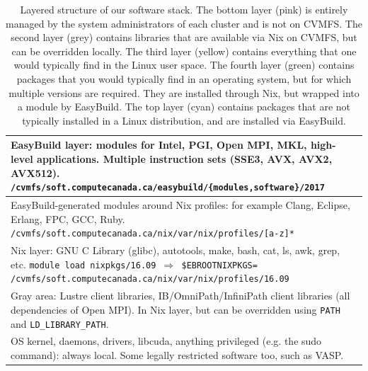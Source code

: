 \documentclass[sigconf]{acmart}
\begin{document}
\begin{table}
  \begin{center}
  {\Large
  \begin{tabular}{|p{}|}
  \hline \cellcolor{cyan}
  EasyBuild layer: modules for Intel, PGI, Open MPI, MKL, high-level applications.
  Multiple instruction sets (SSE3, AVX, AVX2, AVX512).\newline
  \texttt{/cvmfs/soft.computecanada.ca/easybuild/\{modules,software\}/2017}\\
  \hline \cellcolor{green}
  EasyBuild-generated modules around Nix profiles: for example Clang, Eclipse,
  Erlang, FPC, GCC, Ruby.\newline
  \texttt{/cvmfs/soft.computecanada.ca/nix/var/nix/profiles/[a-z]\**}\\
  \hline \cellcolor{yellow}
  Nix layer: GNU C Library (glibc), autotools, make, bash, cat, ls, awk, grep, etc. \newline
  \texttt{module load nixpkgs/16.09 $\Rightarrow$ \$EBROOTNIXPKGS=} \newline
  \texttt{/cvmfs/soft.computecanada.ca/nix/var/nix/profiles/16.09}\\
  \hline \cellcolor{lightgray} 
  Gray area: Lustre client libraries, IB/OmniPath/InfiniPath client libraries 
  (all dependencies of Open MPI). In Nix layer, but can be overridden using
  \texttt{PATH} and \texttt{LD\_LIBRARY\_PATH}.\\
  \hline \cellcolor{pink}
  OS kernel, daemons, drivers, libcuda, anything privileged (e.g. the sudo
  command): always local. Some legally restricted software too, such as VASP.\\
  \hline
  \end{tabular}
  }
  \end{center}
  \caption{Layered structure of our software stack. The bottom layer (pink) is entirely managed by the system administrators of each cluster and is not on CVMFS. The second layer (grey) contains libraries that are available via Nix on CVMFS, but can be overridden locally. The third layer (yellow) contains everything that one would typically find in the Linux user space. The fourth layer (green) contains packages that you would typically find in an operating system, but for which multiple versions are required. They are installed through Nix, but wrapped into a module by EasyBuild. The top layer (cyan) contains packages that are not typically installed in a Linux distribution, and are installed via EasyBuild.}
  \label{tab:layers}
\end{table}
\end{document}
